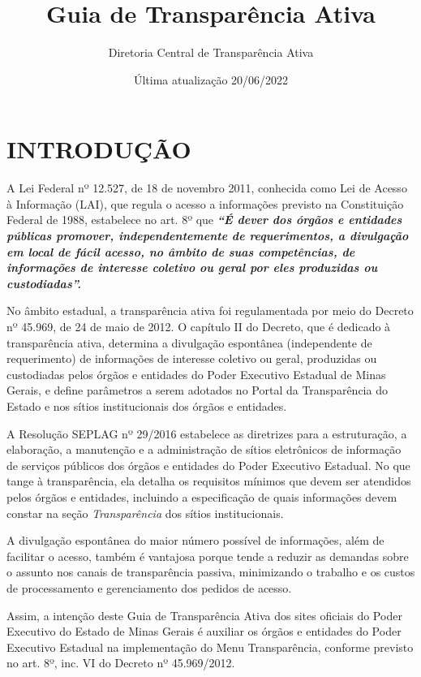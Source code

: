 \documentclass[
]{book}
\title{Guia de Transparência Ativa}
\author{Diretoria Central de Transparência Ativa}
\date{Última atualização 20/06/2022}
\begin{document}
\maketitle

{
\setcounter{tocdepth}{1}
\tableofcontents
}
\hypertarget{introduuxe7uxe3o}{%
\chapter{INTRODUÇÃO}\label{introduuxe7uxe3o}}

A Lei Federal nº 12.527, de 18 de novembro 2011, conhecida como Lei de Acesso à Informação (LAI), que regula o acesso a informações previsto na Constituição Federal de 1988, estabelece no art. 8º que \textbf{\emph{``É dever dos órgãos e entidades públicas promover, independentemente de requerimentos, a divulgação em local de fácil acesso, no âmbito de suas competências, de informações de interesse coletivo ou geral por eles produzidas ou custodiadas''.}}

No âmbito estadual, a transparência ativa foi regulamentada por meio do Decreto nº 45.969, de 24 de maio de 2012. O capítulo II do Decreto, que é dedicado à transparência ativa, determina a divulgação espontânea (independente de requerimento) de informações de interesse coletivo ou geral, produzidas ou custodiadas pelos órgãos e entidades do Poder Executivo Estadual de Minas Gerais, e define parâmetros a serem adotados no Portal da Transparência do Estado e nos sítios institucionais dos órgãos e entidades.

A Resolução SEPLAG nº 29/2016 estabelece as diretrizes para a estruturação, a elaboração, a manutenção e a administração de sítios eletrônicos de informação de serviços públicos dos órgãos e entidades do Poder Executivo Estadual. No que tange à transparência, ela detalha os requisitos mínimos que devem ser atendidos pelos órgãos e entidades, incluindo a especificação de quais informações devem constar na seção \emph{Transparência} dos sítios institucionais.

A divulgação espontânea do maior número possível de informações, além de facilitar o acesso, também é vantajosa porque tende a reduzir as demandas sobre o assunto nos canais de transparência passiva, minimizando o trabalho e os custos de processamento e gerenciamento dos pedidos de acesso.

Assim, a intenção deste Guia de Transparência Ativa dos sites oficiais do Poder Executivo do Estado de Minas Gerais é auxiliar os órgãos e entidades do Poder Executivo Estadual na implementação do Menu Transparência, conforme previsto no art. 8º, inc. VI do Decreto nº 45.969/2012.
\end{document}
